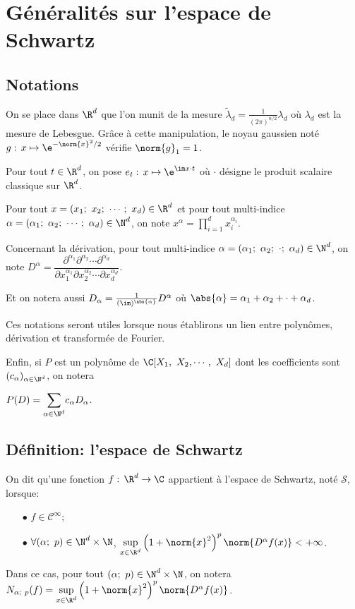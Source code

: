 
\section{Généralités sur l'espace de Schwartz}

\subsection{Notations}

On se place dans $\R^d$ que l'on munit de la mesure $\tilde{\lambda}_d = \frac{1}{(2\pi)^{n/2}} \lambda_d$ où $\lambda_d$ est la mesure de Lebesgue. Grâce à cette manipulation, le noyau gaussien noté $g: \, x \mapsto \e^{-\norm{x}^2/2}$ vérifie $\norm{g}_1 = 1$.


\medskip
Pour tout $t \in \R^d$, on pose $e_t: \, x \mapsto \e^{\im  x \cdot t}$ où \og $\cdot$ \fg{} désigne le produit scalaire \og classique \fg{} sur $\R^d$.

\medskip
Pour tout $x = (x_1;~x_2;~\cdots;~x_d) \in \R^d$ et pour tout multi-indice $\alpha  = (\alpha_1;~\alpha_2;~\cdots;~\alpha_d) \in \N^d$, on note $x^\alpha = \displaystyle{\prod_{i=1}^d} x_i^{\alpha_i}$.

\medskip
Concernant la dérivation, pour tout multi-indice $\alpha  = (\alpha_1;~\alpha_2;~\cdot;~\alpha_d) \in \N^d$, on note $D^\alpha = \dfrac{\partial^{\alpha_1} \partial^{\alpha_2} \cdots \partial^{\alpha_d}}{\partial x_1^{\alpha_1} \partial x_2^{\alpha_2} \cdots \partial x_d^{\alpha_d}}$.

Et on notera aussi $D_{\alpha} = \frac{1}{(\im)^{\abs{\alpha}}} D^{\alpha}$ où $\abs{\alpha} = \alpha_1 + \alpha_2 + \cdot + \alpha_d$.

\medskip
Ces notations seront utiles lorsque nous établirons un lien entre polynômes, dérivation et transformée de Fourier.

\medskip
Enfin, si $P$ est un polynôme de $\C[X_1,~X_2,\cdots,~X_d]$ dont les coefficients sont $(c_{\alpha})_{\alpha  \in \N^d}$, on notera 

$P(D) = \displaystyle{\sum \limits_{\alpha \in \N^d}} c_{\alpha} D_{\alpha}$.


\subsection{Définition: l'espace de Schwartz}

\begin{de}
On dit qu'une fonction $f: \, \R^d \to \C$ appartient à l'espace de Schwartz, noté $\mathcal{S}$, lorsque:
\begin{itemize}
\item[$\bullet$] 
$f \in \mathcal{C}^{\infty}$;
\item[$\bullet$] 
$\forall (\alpha;~p) \in  \N^d \times \N$, $\sup \limits_{x \in \R^d} \left ( 1+\norm{x}^2\right )^{p} \norm{D^{\alpha} f(x)} < +\infty$.
\end{itemize}

Dans ce cas, pour tout $(\alpha;~p) \in  \N^d \times \N$, on notera $N_{\alpha;~p} (f) = \sup \limits_{x \in \R^d} \left ( 1+\norm{x}^2\right )^{p} \norm{D^{\alpha} f(x)}$.
\end{de}

